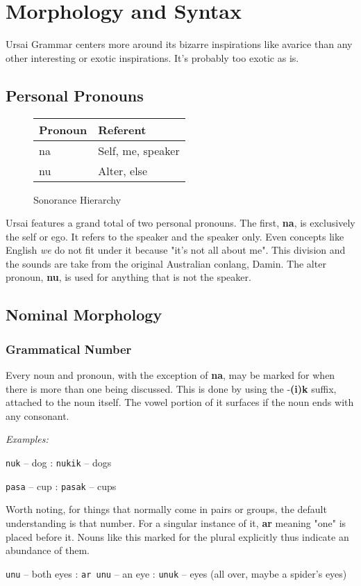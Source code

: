 \documentclass[11pt,letterpaper]{article}
\begin{document}
\pagebreak		
\section{Morphology and Syntax}
  Ursai Grammar centers more around its bizarre inspirations like avarice than any other interesting or exotic inspirations. It's probably too exotic as is.

  \subsection{Personal Pronouns}
    \begin{wrapfigure}{r}{0.4\textwidth}
      \begin{tabular}{|l|l|}
        \hline
        Pronoun    & Referent          \\ \hline \hline
        na         & Self, me, speaker \\ \hline
        nu         & Alter, else       \\ \hline
      \end{tabular}
      \caption{Sonorance Hierarchy}
    \end{wrapfigure}
    \par
    Ursai features a grand total of two personal pronouns. The first, \textbf{na}, is exclusively the self or ego. It refers to the speaker and the speaker only. Even concepts like English \textit{we} do not fit under it because "it's not all about me". This division and the sounds are take from the original Australian conlang, Damin\cite{Damin}. The alter pronoun, \textbf{nu}, is used for anything that is not the speaker. 
  \subsection{Nominal Morphology}
  \subsubsection{Grammatical Number}
  Every noun and pronoun, with the exception of \textbf{na}, may be marked for when there is more than one being discussed. This is done by using the -\textbf{(i)k} suffix, attached to the noun itself. The vowel portion of it surfaces if the noun ends with any consonant.
  \par
  \textit{Examples:}
  \par
  \texttt{nuk}  -- dog : \texttt{nukik} -- dogs
  \par
  \texttt{pasa} -- cup : \texttt{pasak} -- cups
  \par
  Worth noting, for things that normally come in pairs or groups, the default understanding is that number. For a singular instance of it, \textbf{ar} meaning "one" is placed before it. Nouns like this marked for the plural explicitly thus indicate an abundance of them.
  \par
  \texttt{unu} -- both eyes : \texttt{ar unu} -- an eye : \texttt{unuk} -- eyes (all over, maybe a spider's eyes)
  \par
\end{document}
